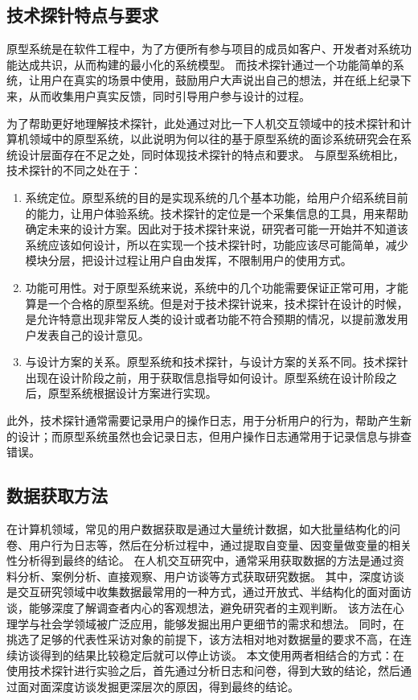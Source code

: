 \subsection{技术探针特点与要求}

原型系统是在软件工程中，为了方便所有参与项目的成员如客户、开发者对系统功能达成共识，从而构建的最小化的系统模型。
而技术探针通过一个功能简单的系统，让用户在真实的场景中使用，鼓励用户大声说出自己的想法，并在纸上纪录下来，从而收集用户真实反馈，同时引导用户参与设计的过程。

为了帮助更好地理解技术探针，此处通过对比一下人机交互领域中的技术探针和计算机领域中的原型系统，以此说明为何以往的基于原型系统的面诊系统研究会在系统设计层面存在不足之处，同时体现技术探针的特点和要求。
与原型系统相比，技术探针的不同之处在于：
\begin{enumerate}
    \item 系统定位。原型系统的目的是实现系统的几个基本功能，给用户介绍系统目前的能力，让用户体验系统。技术探针的定位是一个采集信息的工具，用来帮助确定未来的设计方案。因此对于技术探针来说，研究者可能一开始并不知道该系统应该如何设计，所以在实现一个技术探针时，功能应该尽可能简单，减少模块分层，把设计过程让用户自由发挥，不限制用户的使用方式。

    \item 功能可用性。对于原型系统来说，系统中的几个功能需要保证正常可用，才能算是一个合格的原型系统。但是对于技术探针说来，技术探针在设计的时候，是允许特意出现非常反人类的设计或者功能不符合预期的情况，以提前激发用户发表自己的设计意见。

    \item 与设计方案的关系。原型系统和技术探针，与设计方案的关系不同。技术探针出现在设计阶段之前，用于获取信息指导如何设计。原型系统在设计阶段之后，原型系统根据设计方案进行实现。
\end{enumerate}

此外，技术探针通常需要记录用户的操作日志，用于分析用户的行为，帮助产生新的设计；而原型系统虽然也会记录日志，但用户操作日志通常用于记录信息与排查错误。

\subsection{数据获取方法}
在计算机领域，常见的用户数据获取是通过大量统计数据，如大批量结构化的问卷、用户行为日志等，然后在分析过程中，通过提取自变量、因变量做变量的相关性分析得到最终的结论。
在人机交互研究中，通常采用获取数据的方法是通过资料分析、案例分析、直接观察、用户访谈等方式获取研究数据。
其中，深度访谈是交互研究领域中收集数据最常用的一种方式，通过开放式、半结构化的面对面访谈，能够深度了解调查者内心的客观想法，避免研究者的主观判断。
该方法在心理学与社会学领域被广泛应用，能够发掘出用户更细节的需求和想法。
同时，在挑选了足够的代表性采访对象的前提下，该方法相对地对数据量的要求不高，在连续访谈得到的结果比较稳定后就可以停止访谈\cite{cleary2014data}。
本文使用两者相结合的方式：在使用技术探针进行实验之后，首先通过分析日志和问卷，得到大致的结论，然后通过面对面深度访谈发掘更深层次的原因，得到最终的结论。

